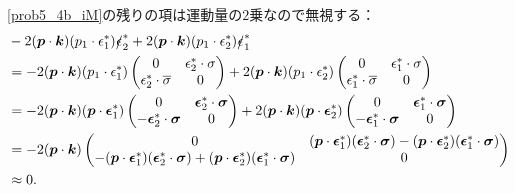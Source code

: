 \eqref{prob5_4b_iM}の残りの項は運動量の$2$乗なので無視する：
\begin{align*}
  & -2 (\boldsymbol{p}\cdot\boldsymbol{k}) (p_1 \cdot \epsilon_1^\ast) \slashed{\epsilon}_2^\ast + 2(\boldsymbol{p}\cdot\boldsymbol{k}) (p_1 \cdot \epsilon_2^\ast) \slashed{\epsilon}_1^\ast \\
  &= -2(\boldsymbol{p}\cdot\boldsymbol{k}) (p_1 \cdot \epsilon_1^\ast)
  \begin{pmatrix}
    0 & \epsilon_2^\ast \cdot \sigma \\
    \epsilon_2^\ast \cdot \overline\sigma & 0
  \end{pmatrix}
  + 2(\boldsymbol{p}\cdot\boldsymbol{k}) (p_1 \cdot \epsilon_2^\ast)
  \begin{pmatrix}
    0 & \epsilon_1^\ast \cdot \sigma \\
    \epsilon_1^\ast \cdot \overline\sigma & 0
  \end{pmatrix}
  \\
  &= -2(\boldsymbol{p}\cdot\boldsymbol{k}) (\boldsymbol{p} \cdot \boldsymbol{\epsilon}_1^\ast)
  \begin{pmatrix}
    0 & \boldsymbol{\epsilon}_2^\ast \cdot \boldsymbol\sigma \\
    -\boldsymbol{\epsilon}_2^\ast \cdot \boldsymbol\sigma & 0
  \end{pmatrix}
  + 2(\boldsymbol{p}\cdot\boldsymbol{k}) (\boldsymbol{p} \cdot \boldsymbol{\epsilon}_2^\ast)
  \begin{pmatrix}
    0 & \boldsymbol{\epsilon}_1^\ast \cdot \boldsymbol\sigma \\
    -\boldsymbol{\epsilon}_1^\ast \cdot \boldsymbol\sigma & 0
  \end{pmatrix}
  \\
  &= -2(\boldsymbol{p}\cdot\boldsymbol{k})
  \begin{pmatrix}
    0 & (\boldsymbol{p} \cdot \boldsymbol{\epsilon}_1^\ast)(\boldsymbol{\epsilon}_2^\ast \cdot \boldsymbol\sigma)
    - (\boldsymbol{p} \cdot \boldsymbol{\epsilon}_2^\ast)(\boldsymbol{\epsilon}_1^\ast \cdot \boldsymbol\sigma)
    \\
    -(\boldsymbol{p} \cdot \boldsymbol{\epsilon}_1^\ast)(\boldsymbol{\epsilon}_2^\ast \cdot \boldsymbol\sigma)
    + (\boldsymbol{p} \cdot \boldsymbol{\epsilon}_2^\ast)(\boldsymbol{\epsilon}_1^\ast \cdot \boldsymbol\sigma)
    & 0
  \end{pmatrix}
  \\
  &\approx 0 .
\end{align*}

